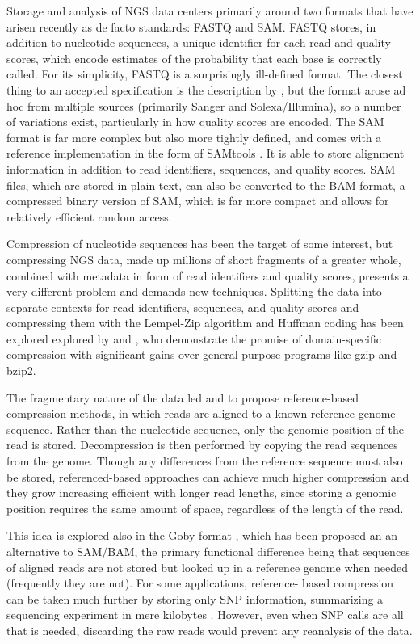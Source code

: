 \documentclass[twocolumn]{article}
\begin{document}
Storage and analysis of NGS data centers primarily around two formats that
have arisen recently as de facto standards: FASTQ and SAM. FASTQ stores, in
addition to nucleotide sequences, a unique identifier for each read and
quality scores, which encode estimates of the probability that each base is
correctly called. For its simplicity, FASTQ is a surprisingly ill-defined
format. The closest thing to an accepted specification is the description by
\citet{Cock2010}, but the format arose ad hoc from multiple sources (primarily
Sanger and Solexa/Illumina), so a number of variations exist, particularly in
how quality scores are encoded. The SAM format is far more complex but also
more tightly defined, and comes with a reference implementation in the form of
SAMtools \citep{Li2009b}. It is able to store alignment information in
addition to read identifiers, sequences, and quality scores. SAM files, which
are stored in plain text, can also be converted to the BAM format, a
compressed binary version of SAM, which is far more compact and allows for
relatively efficient random access.

Compression of nucleotide sequences has been the target of some interest, but
compressing NGS data, made up millions of short fragments of a greater whole,
combined with metadata in form of read identifiers and quality scores,
presents a very different problem and demands new techniques. Splitting the
data into separate contexts for read identifiers, sequences, and quality
scores and compressing them with the Lempel-Zip algorithm and Huffman coding
has been explored explored by \citet{Tembe2010} and \citet{Deorowicz2011}, who
demonstrate the promise of domain-specific compression with significant gains
over general-purpose programs like gzip and bzip2.

The fragmentary nature of the data led \citet{Kozanitis2011} and \citet{Hsi-
YangFritz2011} to propose reference-based compression methods, in which reads
are aligned to a known reference genome sequence. Rather than the nucleotide
sequence, only the genomic position of the read is stored. Decompression is
then performed by copying the read sequences from the genome. Though any
differences from the reference sequence must also be stored, referenced-based
approaches can achieve much higher compression and they grow increasing
efficient with longer read lengths, since storing a genomic position requires
the same amount of space, regardless of the length of the read.

This idea is explored also in the Goby format \citep{Goby2012}, which has been
proposed an an alternative to SAM/BAM, the primary functional difference being
that sequences of aligned reads are not stored but looked up in a reference
genome when needed (frequently they are not). For some applications, reference-
based compression can be taken much further by storing only SNP information,
summarizing a sequencing experiment in mere kilobytes \citep{Christley2009}.
However, even when SNP calls are all that is needed, discarding the raw reads
would prevent any reanalysis of the data.
\end{document}
